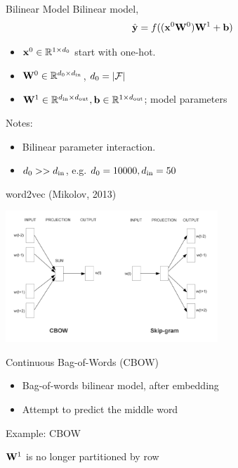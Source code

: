 \documentclass{beamer}
\newlength\matfield
\newlength\tmplength
\def\matscale{1.}
\newcommand\dimbox[3]{%
  \setlength\matfield{\matscale\baselineskip}%
  \setbox0=\hbox{\vphantom{X}\smash{#3}}%
  \setlength{\tmplength}{#1\matfield-\ht0-\dp0}%
  \fboxrule=1pt\fboxsep=-\fboxrule\relax%
  \fbox{\makebox[#2\matfield]{\addstackgap[.5\tmplength]{\box0}}}%
}
\newcommand\matbox[4]{
  \stackunder{\dimbox{#1}{#2}{$#4$}}{\scriptstyle #3}%
}
\begin{document}
\begin{frame}{Bilinear Model}
  Bilinear model,
  \[\hat{\mathbf{y}} = f((\mathbf{x}^0 \mathbf{W}^0)\mathbf{W}^1 + \mathbf{b})\]
  \begin{itemize}
  \item $\mathbf{x}^0 \in \mathbb{R}^{1 \times d_0}$ start with one-hot.
  \item $\mathbf{W}^0 \in \mathbb{R}^{d_0 \times {d_{\mathrm{in}}}}$, $d_0 = |\mathcal{F}|$
  \item $\mathbf{W}^1 \in \mathbb{R}^{{d_{\mathrm{in}}} \times {d_{\mathrm{out}}}}, \mathbf{b} \in \mathbb{R}^{1 \times {d_{\mathrm{out}}}}$; model parameters
  \end{itemize}
  \air
  Notes:
  \begin{itemize}
  \item Bilinear parameter interaction.
  \item $d_0 >> {d_{\mathrm{in}}}$, e.g. $d_0 = 10000, {d_{\mathrm{in}}} = 50$
  \end{itemize}
\end{frame}

\begin{frame}{word2vec (Mikolov, 2013)}
  \begin{center}
    \includegraphics[width=8cm]{word2vec}
  \end{center}
\end{frame}

\begin{frame}{Continuous Bag-of-Words (CBOW) }
  \begin{itemize}
  \item Bag-of-words bilinear model, after embedding
  \item Attempt to predict the middle word
  \end{itemize}

  Example: CBOW


  $\mathbf{W}^1$ is no longer partitioned by row
\end{frame}
\end{document}

